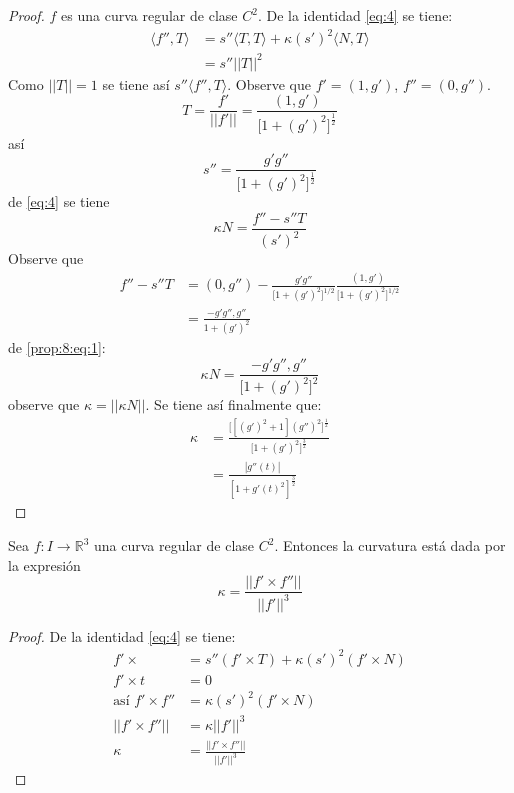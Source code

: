\begin{proof}
  $f$ es una curva regular de clase $C^2$. De la identidad \eqref{eq:4} se
  tiene:
  \begin{align*}
    \langle f'', T \rangle &= s''\langle T, T \rangle +
    \kappa(s')^2\langle N,T \rangle \\
                           &= s'' ||T||^2
  \end{align*}
  Como $||T||=1$ se tiene así $s'' \langle f'' , T \rangle$. Observe que
  $f' = (1, g')$, $f'' = (0, g'')$.
  \[
    T= \frac{f'}{||f'||} = \frac{(1,g')}{\big[ 1 + (g')^2\big]^{\frac{1}{2}}}
  \]
  así 
  \[
    s'' = \frac{g'g''}{\big[ 1 + (g')^2\big]^{\frac{1}{2}}}
  \]
  de \eqref{eq:4} se tiene
  \begin{equation}\label{prop:8:eq:1}
    \kappa N = \frac{f'' - s''T}{(s')^2 } 
  \end{equation}
  Observe que 
  \begin{align*}
    f'' - s''T &=  (0,g'') - \frac{g'g''}{\big[1 +(g')^2\big]^{1/2}}\frac{(1,g')}{\big[1 +
    (g')^2\big]^{1/2}} \\
               &= \frac{-g'g'', g''}{1 + (g')^2}
      \end{align*}
      de \eqref{prop:8:eq:1}:
      \[
        \kappa N = \frac{-g'g'', g''}{\big[1 + (g')^2\big]^2} 
      \]
      observe que $\kappa = ||\kappa N||$.
      Se tiene así finalmente que:
      \begin{align*}
        \kappa &=\frac{\big[ [(g')^2 +1](g'')^2\big]^{\frac{1}{2}}}{\big[1 +
        (g')^2\big]^{\frac{3}{2}}} \\
               &=  \frac{|g''(t)|}{[1 + g'(t)^2]^{\frac{3}{2}}} 
          \end{align*}
        \end{proof}
        \begin{proposition}
          Sea $f: I \to \mathbb{R}^3$ una curva regular de clase $C^2$. Entonces la
          curvatura está dada por la expresión
          \[
            \kappa = \frac{|| f' \times f'' ||}{||f'||^3}  
          \]
        \end{proposition}
        \begin{proof}
          De la identidad \eqref{eq:4} se tiene:
          \begin{align*}
            f' \times &= s'' (f' \times T) + \kappa (s')^2 (f' \times N) \\
            f' \times t &= 0 \\
            \mbox{así } f' \times f'' &=  \kappa (s')^2 (f' \times N) \\
            ||f' \times f'' || &= \kappa ||f'||^3 \\
            \kappa &=  \frac{||f' \times f''||}{||f'||^3}
          \end{align*}
        \end{proof}
